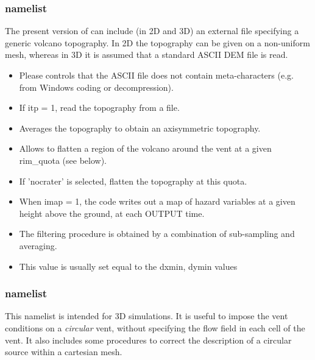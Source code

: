 \subsubsection{ namelist}
The present version of \PDAC can include (in 2D and 3D) an external file specifying a generic volcano topography. In 2D the topography can be given on a non-uniform mesh, whereas in 3D it is assumed that a standard ASCII DEM file is read.

\begin{itemize}
\item
{}
{Please controls that the ASCII file does not contain meta-characters (e.g. from Windows coding or decompression).}

\item
{}
{If itp = 1, read the topography from a file.}

\item
{}
{Averages the topography to obtain an axisymmetric topography.}

\item
{}
{Allows to flatten a region of the volcano around the vent at a given rim\_quota (see below).}

\item
{}
{If 'nocrater' is selected, flatten the topography at this quota.}

\item
{}
{When imap = 1, the code writes out a map of hazard variables at a given height
above the ground, at each OUTPUT time.}

\item
{}
{The filtering procedure is obtained by a combination of sub-sampling and averaging.}

\item
{}
{This value is usually set equal to the dxmin, dymin values}
\end{itemize}

\subsubsection{ namelist}
This namelist is intended for 3D simulations. It is useful to impose the vent
conditions on a {\em circular} vent, without specifying the flow field in each 
cell of the vent. It also includes some procedures to correct the description
of a circular source within a cartesian mesh.

